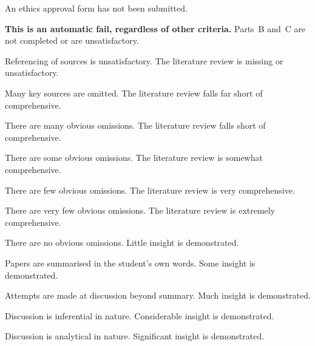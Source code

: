 \documentclass{../fal_assignment}
\begin{document}
\begin{markingrubric}
		\grade\fail An ethics approval form has not been submitted.
			\par \textbf{This is an automatic fail, regardless of other criteria.}
		\grade\fail Parts~B and~C are not completed or are unsatisfactory.
			\par Referencing of sources is unsatisfactory.
        \grade \fail The literature review is missing or unsatisfactory.
        	\par Many key sources are omitted.
        \grade The literature review falls far short of comprehensive.
        	\par There are many obvious omissions.
        \grade The literature review falls short of comprehensive.
        	\par There are some obvious omissions.
        \grade The literature review is somewhat comprehensive.
        	\par There are few obvious omissions.
        \grade The literature review is very comprehensive.
        	\par There are very few obvious omissions.
        \grade The literature review is extremely comprehensive.
        	\par There are no obvious omissions.
        \grade\fail Little insight is demonstrated.
        \par		Papers are summarised in the student's own words.
        \grade		Some insight is demonstrated.
        \par		Attempts are made at discussion beyond summary.
        \grade		Much insight is demonstrated.
        \par		Discussion is inferential in nature.
        \grade		Considerable insight is demonstrated.
        \par		Discussion is analytical in nature.
        \grade		Significant insight is demonstrated.

\end{markingrubric}
\end{document}
